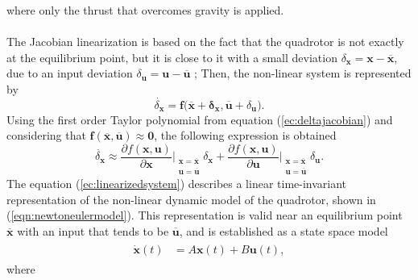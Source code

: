 where only the thrust that overcomes gravity is applied.
\\\\
The Jacobian linearization is based on the fact that the quadrotor is not exactly at the equilibrium point, but it is close to it with a small deviation $\delta_{\mathbf{x}} = \mathbf{x} - \overline{\mathbf{x}}$, due to an input deviation $\delta_{\mathbf{u}}= \mathbf{u} - \overline{\mathbf{u}}$ \cite{RanjanVepa2016}; Then, the non-linear system is represented by
\begin{equation}
\label{ec:deltajacobian}
\dot{\delta_{\mathbf{x}}} =  \mathbf{f(\overline{x}+\delta_{\mathbf{x}},\overline{u}}+\delta_{\mathbf{u}}).
\end{equation}
Using the first order Taylor polynomial from equation (\ref{ec:deltajacobian}) and considering that $\mathbf{f(\overline{x},\overline{u})} \approx \mathbf{0}$, the following expression is obtained
\begin{equation}
\label{ec:linearizedsystem}
\dot{\delta_{\mathbf{x}}} \approx 
\frac{\partial f(\mathbf{x},\mathbf{u})}{\partial \mathbf{x}}\Bigr|_{\substack{\mathbf{x}=\overline{\mathbf{x}}\\\mathbf{u}=\overline{\mathbf{u}}}} \delta_{\mathbf{x}} + \frac{\partial f(\mathbf{x},\mathbf{u})}{\partial \mathbf{u}}\Bigr|_{\substack{\mathbf{x}=\overline{\mathbf{x}}\\\mathbf{u}=\overline{\mathbf{u}}}} \delta_{\mathbf{u}}.
\end{equation}
The equation (\ref{ec:linearizedsystem}) describes a linear time-invariant representation of the non-linear dynamic model of the quadrotor, shown in (\ref{eqn:newtoneulermodel}). This representation is valid near an equilibrium point $\overline{\mathbf{x}}$  with an input that tends to be $\overline{\mathbf{u}}$, and is established as a state space model
\begin{align}
\begin{split}
\dot{\mathbf{x}}(t) & = A\mathbf{x}(t)+B\mathbf{u}(t),
\end{split}
\end{align}
where
